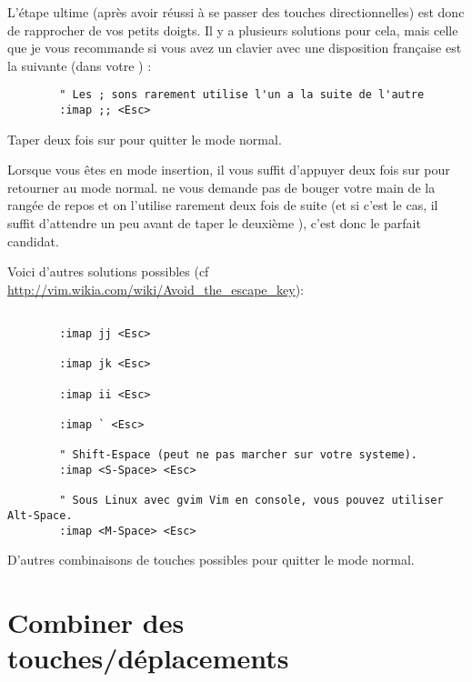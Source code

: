 L'étape ultime (après avoir réussi à se passer des touches directionnelles) est donc de rapprocher \ttesc de vos petits doigts. Il y a plusieurs solutions pour cela, mais celle que je vous recommande si vous avez un clavier avec une disposition française est la suivante (dans votre \vimrc) :

\begin{listing}[H]

    \begin{verbatim}
        " Les ; sons rarement utilise l'un a la suite de l'autre
        :imap ;; <Esc>
    \end{verbatim}
    \caption{Taper deux fois sur \hlred{;} pour quitter le mode normal.}
    \label{code:avoid-esc}
\end{listing}

Lorsque vous êtes en mode insertion, il vous suffit d'appuyer deux fois sur \ttsemicolon pour retourner au mode normal. \ttsemicolon ne vous demande pas de bouger votre main de la rangée de repos et on l'utilise rarement deux fois de suite (et si c'est le cas, il suffit d'attendre un peu avant de taper le deuxième \tsemicolon), c'est donc le parfait candidat.

Voici d'autres solutions possibles (cf \url{http://vim.wikia.com/wiki/Avoid_the_escape_key}):

\begin{listing}[H]
    \begin{verbatim}

        :imap jj <Esc>

        :imap jk <Esc>

        :imap ii <Esc>

        :imap ` <Esc>

        " Shift-Espace (peut ne pas marcher sur votre systeme).
        :imap <S-Space> <Esc>

        " Sous Linux avec gvim Vim en console, vous pouvez utiliser Alt-Space.
        :imap <M-Space> <Esc>
    \end{verbatim}
    \caption{D'autres combinaisons de touches possibles pour quitter le mode normal.}
    \label{code:avoid-esc-alt}
\end{listing}

\section{Combiner des touches/déplacements}
\label{sec:combine-move}

